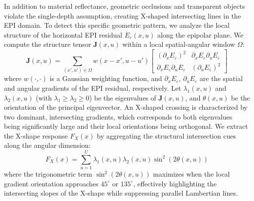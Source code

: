 \documentclass[lettersize,journal]{IEEEtran}
\begin{document}
In addition to material reflectance, geometric occlusions and transparent objects violate the single-depth assumption, creating X-shaped intersecting lines in the EPI domain. To detect this specific geometric pattern, we analyze the local structure of the horizontal EPI residual $E_{\varepsilon}(x, u)$ along the epipolar plane. We compute the structure tensor $\mathbf{J}(x,u)$ within a local spatial-angular window $\Omega$:
\begin{equation}
\mathbf{J}(x,u) = \sum_{(x',u') \in \Omega} w(x-x', u-u') \begin{bmatrix} (\partial_x E_{\varepsilon})^2 & \partial_x E_{\varepsilon} \partial_u E_{\varepsilon} \\ \partial_x E_{\varepsilon} \partial_u E_{\varepsilon} & (\partial_u E_{\varepsilon})^2 \end{bmatrix}
\label{eq:ch3_14}
\end{equation}
where $w(\cdot, \cdot)$ is a Gaussian weighting function, and $\partial_x E_{\varepsilon}$, $\partial_u E_{\varepsilon}$ are the spatial and angular gradients of the EPI residual, respectively. Let $\lambda_1(x,u)$ and $\lambda_2(x,u)$ (with $\lambda_1 \ge \lambda_2 \ge 0$) be the eigenvalues of $\mathbf{J}(x,u)$, and $\theta(x,u)$ be the orientation of the principal eigenvector. An X-shaped crossing is characterized by two dominant, intersecting gradients, which corresponds to both eigenvalues being significantly large and their local orientations being orthogonal. We extract the X-shape response $F_{X}(x)$ by aggregating the structural intersection cues along the angular dimension:
\begin{equation}
F_{X}(x) = \sum_{u=1}^{U} \lambda_1(x,u) \lambda_2(x,u) \sin^2(2\theta(x,u))
\label{eq:ch3_15}
\end{equation}
where the trigonometric term $\sin^2(2\theta(x,u))$ maximizes when the local gradient orientation approaches $45^\circ$ or $135^\circ$, effectively highlighting the intersecting slopes of the X-shape while suppressing parallel Lambertian lines.
\end{document}
